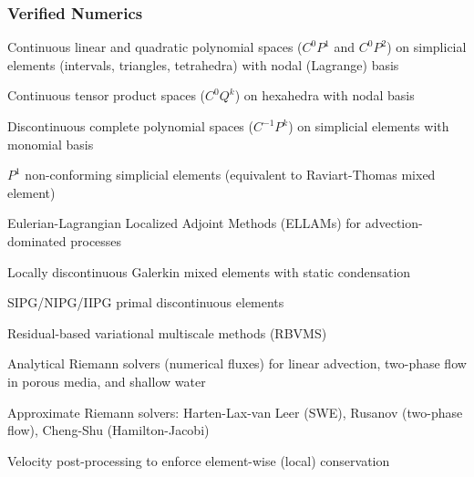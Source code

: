 \documentclass{beamer}
\begin{document}
\begin{frame}
\frametitle{Verified Numerics}
\bit
\footnotesize
\item Continuous linear and quadratic polynomial spaces ($C^0 P^1$ and
  $C^0 P^2$) on simplicial elements (intervals, triangles, tetrahedra)
  with nodal (Lagrange) basis
\item Continuous tensor product spaces ($C^0 Q^k$) on hexahedra with
  nodal basis
\item Discontinuous complete polynomial spaces ($C^{-1} P^k$) on
  simplicial elements with monomial basis
\item $P^1$ non-conforming simplicial elements (equivalent to
  Raviart-Thomas mixed element)
\item Eulerian-Lagrangian Localized Adjoint Methods (ELLAMs) for
  advection-dominated processes
\item Locally discontinuous Galerkin mixed elements with static
  condensation
\item SIPG/NIPG/IIPG primal discontinuous elements
\item Residual-based variational multiscale methods (RBVMS)
\item Analytical Riemann solvers (numerical fluxes) for linear
  advection, two-phase flow in porous media, and shallow water
\item Approximate Riemann solvers: Harten-Lax-van Leer (SWE), Rusanov
  (two-phase flow), Cheng-Shu (Hamilton-Jacobi)
\item Velocity post-processing to enforce element-wise (local)
  conservation \eit
\end{frame}
\end{document}
